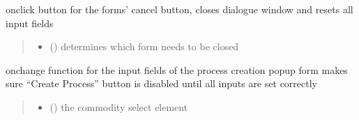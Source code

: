 \documentclass[letterpaper,10pt,english]{sphinxmanual}
\begin{document}

\begin{fulllineitems}
\label{\detokenize{docs_gui/js_api/urbs_editor/process_editor:closeNewProcessForm}}
\pysigstartsignatures
{}
\pysigstopsignatures
\sphinxAtStartPar
onclick button for the forms’ cancel button, closes dialogue window and resets all input fields
\begin{quote}\begin{description}
\begin{itemize}
\item {} 
\sphinxAtStartPar
{} () \textendash{} determines which form needs to be closed

\end{itemize}

\end{description}\end{quote}

\end{fulllineitems}


\begin{fulllineitems}
\label{\detokenize{docs_gui/js_api/urbs_editor/process_editor:newProcessFormVerifyInputs}}
\pysigstartsignatures
{}
\pysigstopsignatures
\sphinxAtStartPar
onchange function for the input fields of the process creation popup form
makes sure “Create Process” button is disabled until all inputs are set correctly
\begin{quote}\begin{description}
\begin{itemize}
\item {} 
\sphinxAtStartPar
{} () \textendash{} the commodity select element

\end{itemize}

\end{description}\end{quote}

\end{fulllineitems}
\end{document}
